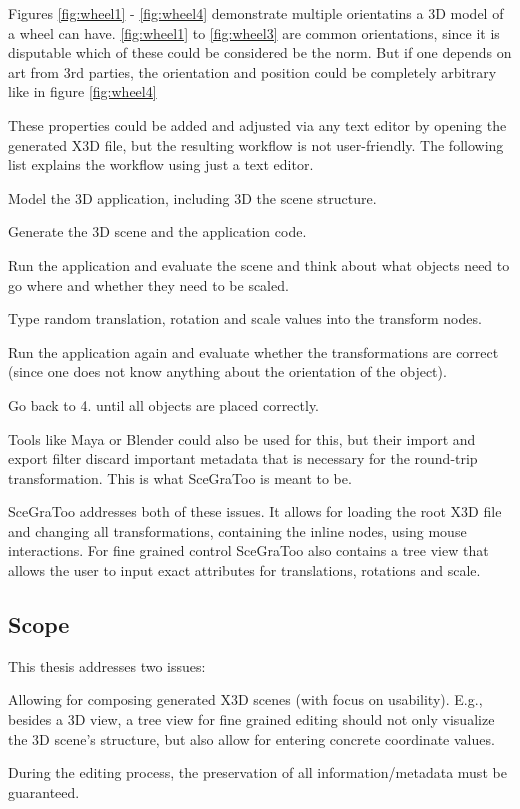 Figures \ref{fig:wheel1} - \ref{fig:wheel4} demonstrate multiple orientatins a
3D model of a wheel can have. \ref{fig:wheel1} to \ref{fig:wheel3} are common
orientations, since it is disputable which of these could be considered be the
norm. But if one depends on art from 3rd parties, the orientation and position
could be completely arbitrary like in figure \ref{fig:wheel4}

These properties could be added and adjusted via any text editor by opening the
generated \gls{X3D} file, but the resulting workflow is not user-friendly. The
following list explains the workflow using just a text editor.

\begin{enumerate*}
  \item Model the 3D application, including 3D the scene structure.
  \item Generate the 3D scene and the application code.
  \item Run the application and evaluate the scene and think about what objects need to go where and whether they need to be scaled.
  \item Type random translation, rotation and scale values into the transform nodes.
  \item Run the application again and evaluate whether the transformations are correct (since one does not know anything about the orientation of the object).
  \item Go back to 4. until all objects are placed correctly.
\end{enumerate*}

Tools like Maya or Blender could also be used for this, but their import
and export filter discard important metadata that is necessary for the
round-trip transformation. This is what SceGraToo is meant to be.

SceGraToo addresses both of these issues. It allows for loading the root
X3D file and changing all transformations, containing the inline nodes,
using mouse interactions. For fine grained control SceGraToo also
contains a tree view that allows the user to input exact attributes for
translations, rotations and scale.

\subsection{Scope}\label{scope}

This thesis addresses two issues:

\begin{enumerate*}
  \item Allowing for composing generated X3D scenes (with focus on usability). E.g., besides a 3D view, a tree view for fine grained editing should not only visualize the 3D scene's structure, but also allow for entering concrete coordinate values.
  \item During the editing process, the preservation of all information/metadata must be guaranteed.
\end{enumerate*}
